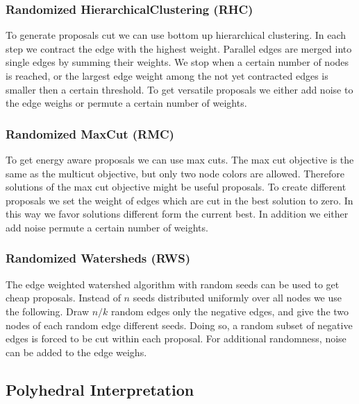 \documentclass[10pt,twocolumn,letterpaper]{article}
\begin{document}
\subsubsection{Randomized HierarchicalClustering (RHC)}

To generate proposals cut we can use bottom up hierarchical clustering.
In each step we contract the edge with the highest weight.
Parallel edges are merged into single edges by summing their weights.
We stop when a certain number of nodes is reached, or the
largest edge weight among the not yet contracted edges is smaller then a certain threshold.
To get versatile proposals we either add noise 
to the edge weighs or permute a certain number of weights.


\subsubsection{Randomized MaxCut  (RMC)}

To get energy aware proposals we can use max cuts.
The max cut objective is the same as
the multicut objective, but only two 
node colors are allowed.
Therefore solutions of the max cut objective
might be useful proposals.
To create different proposals we set 
the weight of edges which are cut 
in the best solution to zero.
In this way we favor solutions 
different form the current best. 
In addition we either add noise permute a certain number of weights.


\subsubsection{Randomized Watersheds (RWS)}

The edge weighted watershed algorithm \cite{meyer_2013}
with random seeds can be used to get 
cheap proposals. Instead of $n$ seeds distributed uniformly
over all nodes we use the following.
Draw $n/k$ random edges only the negative edges, 
and give the two nodes of each random edge different seeds.
Doing so, a random subset of negative edges is forced
to be cut within each proposal.
For additional randomness, noise can be added to
the edge weighs.





\subsection{Polyhedral Interpretation}

\end{document}
